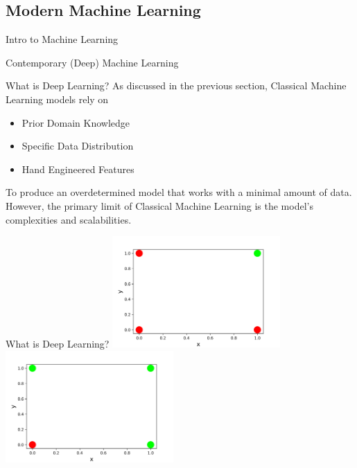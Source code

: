 \documentclass{beamer}
\begin{document}
\subsection{Modern Machine Learning}
\begin{frame}[fragile]{Intro to Machine Learning}
    \begin{center}
        \Huge Contemporary (Deep) Machine Learning
    \end{center}
\end{frame}
\begin{frame}[fragile]{What is Deep Learning?}
    As discussed in the previous section, Classical Machine Learning models rely on 
    \begin{itemize}
        \item Prior Domain Knowledge
        \item Specific Data Distribution
        \item Hand Engineered Features
    \end{itemize}
    To produce an overdetermined model that works with a minimal amount of data. However, the primary limit of Classical Machine Learning is the model's complexities and scalabilities.
\end{frame}
\begin{frame}[fragile]{What is Deep Learning?}
    \includegraphics[width=0.48\textwidth,height=\textheight,keepaspectratio]{figures/And Example.png}
    \includegraphics[width=0.48\textwidth,height=\textheight,keepaspectratio]{figures/Or Example.png}
\end{frame}
\end{document}
